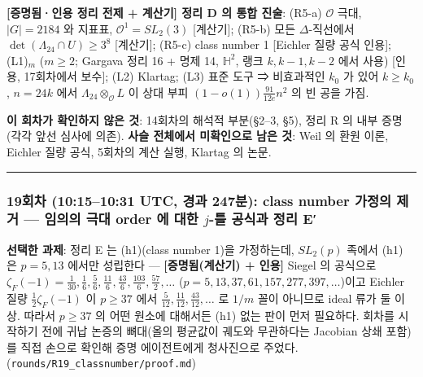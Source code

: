 \textbf{{[}증명됨·인용 정리 전제 + 계산기{]} 정리 D 의 통합 진술}: (R5-a) \(\mathcal O\) 극대, \(|G|=2184\) 와 지표표, \(\mathcal O^1=SL_2(3)\) {[}계산기{]}; (R5-b) 모든 \(\Delta\)-직선에서 \(\det(\Lambda_{24}\cap U)\ge3^8\) {[}계산기{]}; (R5-c) class number 1 {[}Eichler 질량 공식 인용{]}; (L1)\(_m\) (\(m\ge2\); Gargava 정리 16 + 명제 14, \(\mathbb H^2\), 랭크 \(k,k-1,k-2\) 에서 사용) {[}인용, 17회차에서 보수{]}; (L2) Klartag; (L3) 표준 도구 ⇒ 비효과적인 \(k_0\) 가 있어 \(k\ge k_0\), \(n=24k\) 에서 \(\Lambda_{24}\otimes_{\mathcal O}L\) 이 상대 부피 \((1-o(1))\frac{91}{12e}n^2\) 의 빈 공을 가짐.

\textbf{이 회차가 확인하지 않은 것}: 14회차의 해석적 부분(§2--3, §5), 정리 R 의 내부 증명(각각 앞선 심사에 의존). \textbf{사슬 전체에서 미확인으로 남은 것}: Weil 의 환원 이론, Eichler 질량 공식, 5회차의 계산 실행, Klartag 의 논문.

\begin{center}\rule{0.5\linewidth}{0.5pt}\end{center}

\hypertarget{uxd68cuxcc28-10151031-utc-uxacbduxacfc-247uxbd84-class-number-uxac00uxc815uxc758-uxc81cuxac70-uxc784uxc758uxc758-uxadf9uxb300-order-uxc5d0-uxb300uxd55c-j-uxd2c0-uxacf5uxc2dduxacfc-uxc815uxb9ac-e}{%
\subsubsection*{\texorpdfstring{19회차 (10:15--10:31 UTC, 경과 247분): class number 가정의 제거 --- 임의의 극대 order 에 대한 \(j\)-틀 공식과 정리 E′}{19회차 (10:15--10:31 UTC, 경과 247분): class number 가정의 제거 --- 임의의 극대 order 에 대한 j-틀 공식과 정리 E′}}\label{uxd68cuxcc28-10151031-utc-uxacbduxacfc-247uxbd84-class-number-uxac00uxc815uxc758-uxc81cuxac70-uxc784uxc758uxc758-uxadf9uxb300-order-uxc5d0-uxb300uxd55c-j-uxd2c0-uxacf5uxc2dduxacfc-uxc815uxb9ac-e}}

\textbf{선택한 과제}: 정리 E 는 (h1)(class number 1)을 가정하는데, \(SL_2(p)\) 족에서 (h1) 은 \(p=5,13\) 에서만 성립한다 --- \textbf{{[}증명됨(계산기) + 인용{]}} Siegel 의 공식으로 \(\zeta_F(-1)=\frac1{30},\frac16,\frac56,\frac{11}6,\frac{43}6,\frac{103}6,\frac{57}2,\dots\) (\(p=5,13,37,61,157,277,397,\dots\))이고 Eichler 질량 \(\frac12\zeta_F(-1)\) 이 \(p\ge37\) 에서 \(\frac5{12},\frac{11}{12},\frac{43}{12},\dots\) 로 \(1/m\) 꼴이 아니므로 ideal 류가 둘 이상. 따라서 \(p\ge37\) 의 어떤 원소에 대해서든 (h1) 없는 판이 먼저 필요하다. 회차를 시작하기 전에 귀납 논증의 뼈대(올의 평균값이 궤도와 무관하다는 Jacobian 상쇄 포함)를 직접 손으로 확인해 증명 에이전트에게 청사진으로 주었다. (\texttt{rounds/R19\_classnumber/proof.md})


